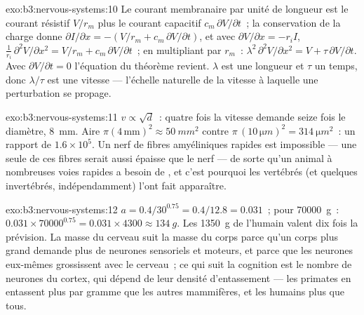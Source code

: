 \begin{solution}{exo:b3:nervous-systems:10}
Le courant membranaire par unité de longueur est le courant résistif
$V/r_{m}$ plus le courant capacitif $c_{m}\,\partial V/\partial t$~; la
conservation de la charge donne
$\partial I/\partial x = -(V/r_{m} + c_{m}\,\partial V/\partial t)$, et
avec $\partial V/\partial x = -r_{i}I$, $\frac{1}{r_{i}}\,\partial^{2}V/
\partial x^{2} = V/r_{m} + c_{m}\,\partial V/\partial t$~; en multipliant
par $r_{m}$~: $\lambda^{2}\,\partial^{2}V/\partial x^{2} = V + \tau\,\partial
V/\partial t$. Avec $\partial V/\partial t = 0$ l'équation du théorème
revient. $\lambda$ est une longueur et $\tau$ un temps, donc
$\lambda/\tau$ est une vitesse --- l'échelle naturelle de la vitesse à
laquelle une perturbation se propage.
\end{solution}

\begin{solution}{exo:b3:nervous-systems:11}
$v \propto \sqrt{d}$~: quatre fois la vitesse demande seize fois le
diamètre, \qty{8}{mm}. Aire $\pi(4\,\text{mm})^{2} \approx \qty{50}{mm^2}$
contre $\pi\,(10\,\unit{\micro m})^{2} = \qty{314}{\micro m^2}$~: un
rapport de $1.6\times 10^{5}$. Un nerf de fibres amyéliniques rapides est
impossible --- une seule de ces fibres serait aussi épaisse que le nerf
--- de sorte qu'un animal à nombreuses voies rapides a besoin de
, et c'est pourquoi les vertébrés (et quelques invertébrés,
indépendamment) l'ont fait apparaître.
\end{solution}

\begin{solution}{exo:b3:nervous-systems:12}
$a = 0.4/30^{0.75} = 0.4/12.8 = 0.031$~; pour \qty{70000}{g}~: $0.031\times
\num{70000}^{0.75} = 0.031\times 4300 \approx \qty{134}{g}$. Les
\qty{1350}{g} de l'humain valent dix fois la prévision. La masse du
cerveau suit la masse du corps parce qu'un corps plus grand demande plus
de neurones sensoriels et moteurs, et parce que les neurones eux-mêmes
grossissent avec le cerveau~; ce qui suit la cognition est le nombre de
neurones du cortex, qui dépend de leur densité d'entassement --- les
primates en entassent plus par gramme que les autres mammifères, et les
humains plus que tous.
\end{solution}

